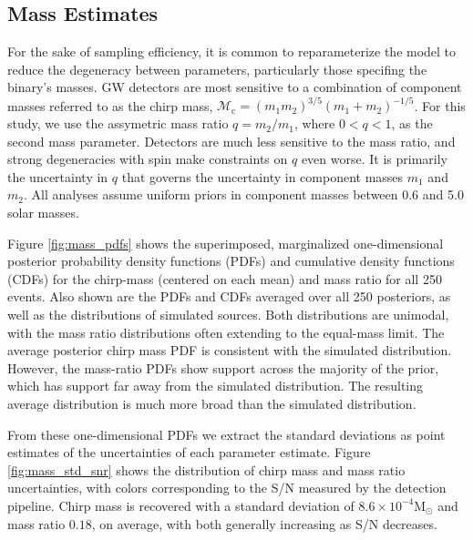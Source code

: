 \subsection{Mass Estimates}

For the sake of sampling efficiency, it is common to reparameterize the model to reduce the degeneracy between parameters, particularly those specifing the binary's masses.  GW detectors are most sensitive to a combination of component masses referred to as the chirp mass, $\mathcal{M}_\mathrm{c} = (m_1 m_2)^{3/5} (m_1 + m_2)^{-1/5}$.  For this study, we use the assymetric mass ratio $q = m_2/m_1$, where $0 < q < 1$, as the second mass parameter.  Detectors are much less sensitive to the mass ratio, and strong degeneracies with spin make constraints on $q$ even worse.  It is primarily the uncertainty in $q$ that governs the uncertainty in component masses $m_1$ and $m_2$.  All analyses assume uniform priors in component masses between 0.6 and 5.0 solar masses.

Figure \ref{fig:mass_pdfs} shows the superimposed, marginalized one-dimensional posterior probability density functions (PDFs) and cumulative density functions (CDFs) for the chirp-mass (centered on each mean) and mass ratio for all 250 events.  Also shown are the PDFs and CDFs averaged over all 250 posteriors, as well as the distributions of simulated sources.  Both distributions are unimodal, with the mass ratio distributions often extending to the equal-mass limit.  The average posterior chirp mass PDF is consistent with the simulated distribution.  However, the mass-ratio PDFs show support across the majority of the prior, which has support far away from the simulated distribution.  The resulting average distribution is much more broad than the simulated distribution.

From these one-dimensional PDFs we extract the standard deviations as point estimates of the uncertainties of each parameter estimate.  Figure \ref{fig:mass_std_snr} shows the distribution of chirp mass and mass ratio uncertainties, with colors corresponding to the S/N measured by the detection pipeline.  Chirp mass is recovered with a standard deviation of $8.6 \times 10^{-4} \mathrm{M}_\odot$ and mass ratio $0.18$, on average, with both generally increasing as S/N decreases.